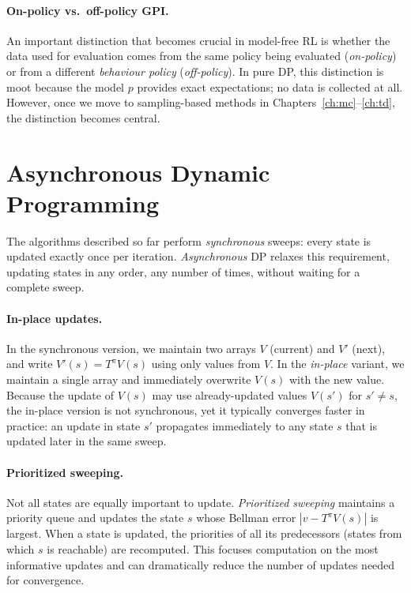 \paragraph{On-policy vs.\ off-policy GPI.}
An important distinction that becomes crucial in model-free RL is whether the data used for evaluation comes from the same policy being evaluated (\emph{on-policy}) or from a different \emph{behaviour policy} (\emph{off-policy}).  In pure DP, this distinction is moot because the model $p$ provides exact expectations; no data is collected at all.  However, once we move to sampling-based methods in Chapters~\ref{ch:mc}--\ref{ch:td}, the distinction becomes central.

\section{Asynchronous Dynamic Programming}
\label{sec:async-dp}

The algorithms described so far perform \emph{synchronous} sweeps: every state is updated exactly once per iteration.  \emph{Asynchronous} DP relaxes this requirement, updating states in any order, any number of times, without waiting for a complete sweep.

\paragraph{In-place updates.}
In the synchronous version, we maintain two arrays $V$ (current) and $V'$ (next), and write $V'(s) = T^\pi V(s)$ using only values from $V$.  In the \emph{in-place} variant, we maintain a single array and immediately overwrite $V(s)$ with the new value.  Because the update of $V(s)$ may use already-updated values $V(s')$ for $s' \ne s$, the in-place version is not synchronous, yet it typically converges faster in practice: an update in state $s'$ propagates immediately to any state $s$ that is updated later in the same sweep.

\paragraph{Prioritized sweeping.}
Not all states are equally important to update.  \emph{Prioritized sweeping} maintains a priority queue and updates the state $s$ whose Bellman error $|v - T^\pi V(s)|$ is largest.  When a state is updated, the priorities of all its predecessors (states from which $s$ is reachable) are recomputed.  This focuses computation on the most informative updates and can dramatically reduce the number of updates needed for convergence.

